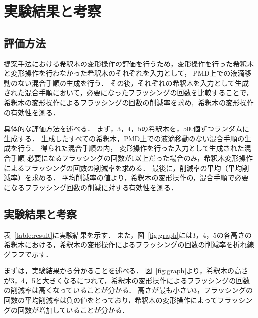 \chapter{実験結果と考察}

\section{評価方法}
提案手法における希釈木の変形操作の評価を行うため，変形操作を行った希釈木と変形操作を行わなかった希釈木のそれぞれを入力として，
PMD上での液滴移動のない混合手順の生成を行う．
その後，それぞれの希釈木を入力として生成された混合手順において，必要になったフラッシングの回数を比較することで，
希釈木の変形操作によるフラッシングの回数の削減率を求め，希釈木の変形操作の有効性を測る．

具体的な評価方法を述べる．
まず，3，4，5の希釈木を，500個ずつランダムに生成する．
生成したすべての希釈木，PMD上での液滴移動のない混合手順の生成を行う．
得られた混合手順の内，
変形操作を行った入力として生成された混合手順
必要になるフラッシングの回数が1以上だった場合のみ，希釈木変形操作によるフラッシングの回数の削減率を求める．
最後に，削減率の平均（平均削減率）を求める．
平均削減率の値より，希釈木の変形操作の，混合手順で必要になるフラッシング回数の削減に対する有効性を測る．

\section{実験結果と考察}
表~\ref{table:result}に実験結果を示す．
また，図~\ref{fig:graph}には3，4，5の各高さの希釈木における，希釈木の変形操作によるフラッシングの回数の削減率を折れ線グラフで示す．

まずは，実験結果から分かることを述べる．
図~\ref{fig:graph}より，希釈木の高さが3，4，5と大きくなるにつれて，希釈木の変形操作によるフラッシングの回数の削減率は高くなっていることが分かる．
高さが最も小さい3，フラッシングの回数の平均削減率は負の値をとっており，希釈木の変形操作によってフラッシングの回数が増加していることが分かる．

